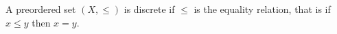 A preordered set $(X, \leqslant)$ is discrete if $\leqslant$ is the equality relation, that is if $x \leqslant y$ then $x = y$.
